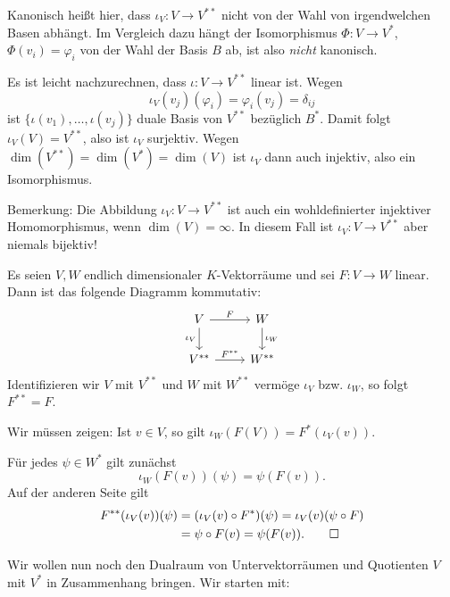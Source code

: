 Kanonisch heißt hier, dass $\iota_V \colon V \rightarrow V^{**}$ nicht von der Wahl von irgendwelchen Basen abhängt.
Im Vergleich dazu hängt der Isomorphismus $\Phi\colon V \rightarrow V^*$, $\Phi(v_i) = \varphi_i$ von der Wahl der Basis $B$ ab, ist also \textit{nicht} kanonisch. 

\begin{beweis}
	Es ist leicht nachzurechnen, dass $\iota\colon V \rightarrow V^{**}$ linear ist.
	Wegen
	\[
		\iota_V(v_j)(\varphi_i) = \varphi_i(v_j) = \delta_{ij}
	\]
	ist $\{\iota(v_1),\dots,\iota(v_j)\}$ duale Basis von $V^{**}$ bezüglich $B^*$.
	Damit folgt $\iota_V(V) = V^{**}$, also ist $\iota_V$ surjektiv.
	Wegen $\dim(V^{**}) = \dim(V^*) = \dim(V)$ ist $\iota_V$ dann auch injektiv, also ein Isomorphismus. \qedhere
\end{beweis}

Bemerkung: Die Abbildung $\iota_V \colon V \rightarrow V^{**}$ ist auch ein wohldefinierter injektiver Homomorphismus, wenn $\dim(V) = \infty$.
In diesem Fall ist $\iota_V \colon V \rightarrow V^{**}$ aber niemals bijektiv!

\begin{satz}
	\label{satz:12.12}
	Es seien $V,W$ endlich dimensionaler $K$-Vektorräume und sei $F \colon V \rightarrow W$ linear.
	Dann ist das folgende Diagramm kommutativ:
	\[
		\begin{tikzcd}
			V \arrow[r,"F"] \arrow[d,"\iota_V"'] & W \arrow[d,"\iota_W"] \\
			V^{**} \arrow[r,"F^{**}"] & W^{**}
		\end{tikzcd}
	\]
	Identifizieren wir $V$ mit $V^{**}$ und $W$ mit $W^{**}$ vermöge $\iota_V$ bzw. $\iota_W$, so folgt $F^{**} = F$.
\end{satz}

\begin{beweis}
	Wir müssen zeigen:
	Ist $v \in V$, so gilt $\iota_W(F(V)) = F^*(\iota_V(v))$.
	
	Für jedes $\psi \in W^*$ gilt zunächst
	\[
		\iota_W(F(v))(\psi) = \psi(F(v)).
	\]
	Auf der anderen Seite gilt
	\begin{align*}
		F^{**}(\iota_V(v))(\psi) &= (\iota_V(v) \circ F^*)(\psi) = \iota_V(v)(\psi \circ F) \\
		&= \psi \circ F(v) = \psi(F(v)). \qedhere
	\end{align*}
\end{beweis}

Wir wollen nun noch den Dualraum von Untervektorräumen und Quotienten $V$ mit $V^*$ in Zusammenhang bringen.
Wir starten mit: